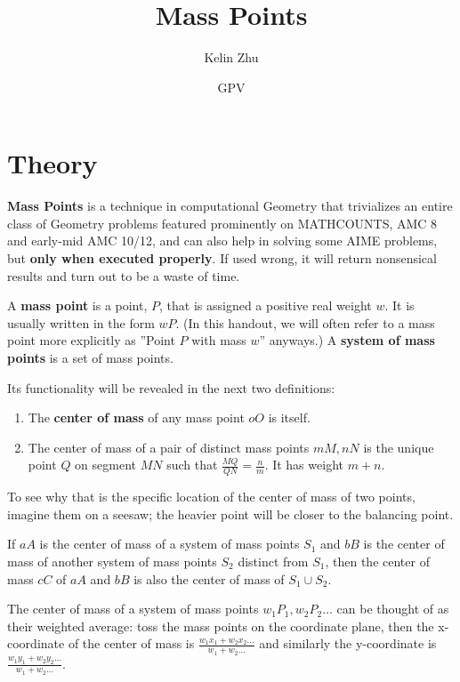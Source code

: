 \documentclass{article}
\title{Mass Points}
\author{Kelin Zhu}
\date{GPV}
\begin{document}
\maketitle
\section{Theory}
\textbf{Mass Points} is a technique in computational Geometry that trivializes an entire class of Geometry problems featured prominently on MATHCOUNTS, AMC 8 and early-mid AMC 10/12, and can also help in solving some AIME problems, but \textbf{only when executed properly}. If used wrong, it will return nonsensical results and turn out to be a waste of time.
\begin{defi}
A \textbf{mass point} is a point, $P$, that is assigned a positive real weight $w$. It is usually written in the form $wP$. (In this handout, we will often refer to a mass point more explicitly as ''Point $P$ with mass $w$'' anyways.) A \textbf{system of mass points} is a set of mass points.
\end{defi}
Its functionality will be revealed in the next two definitions:
\begin{defi}

\begin{enumerate}
\item The \textbf{center of mass} of any mass point $oO$ is itself.
\item The center of mass of a pair of distinct mass points $mM,nN$ is the unique point $Q$ on segment $MN$ such that $\frac{MQ}{QN}=\frac{n}{m}$. It has weight $m+n$.
\end{enumerate}
\end{defi}
To see why that is the specific location of the center of mass of two points, imagine them on a seesaw; the heavier point will be closer to the balancing point.
\begin{defi}

If $aA$ is the center of mass of a system of mass points $S_1$ and $bB$ is the center of mass of another system of mass points $S_2$ distinct from $S_1$, then the center of mass $cC$ of $aA$ and $bB$ is also the center of mass of $S_1\cup S_2$.

The center of mass of a system of mass points $w_1P_1,w_2P_2\ldots$ can be thought of as their weighted average: toss the mass points on the coordinate plane, then the x-coordinate of the center of mass is $\frac{w_1x_1+w_2x_2\ldots}{w_1+w_2\ldots}$ and similarly the y-coordinate is $\frac{w_1y_1+w_2y_2\ldots}{w_1+w_2\ldots}$.
\end{defi}
\end{document}

